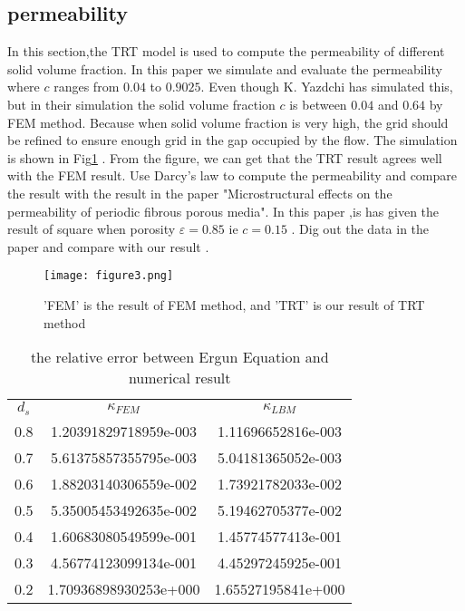 \documentclass{article}
\begin{document}
\subsection{\label{sec:level1}permeability}
In this section,the TRT model is used to compute the permeability of different solid volume fraction. In this paper we simulate and evaluate the permeability where $c$ ranges from $0.04$ to $0.9025$. Even though K. Yazdchi has simulated this, but in their simulation the solid volume fraction $c$ is between $0.04$ and $0.64$ by FEM method. Because when solid volume fraction is very high,  the grid should be refined to ensure enough grid in the gap occupied by the flow.
The simulation is shown in Fig\ref{Fig.lable3} . From the figure, we can get that the TRT result agrees well with the FEM result.
Use Darcy's law to compute the permeability and compare the result with the result in the paper "Microstructural effects on the permeability of periodic fibrous porous media". In this paper ,is has given the result of square when porosity $\varepsilon = 0.85$ ie $c = 0.15$  . Dig out the data in the paper and compare with our result .
\begin{figure}[!ht]
  \centering
  \texttt{[image: figure3.png]}\\
  \caption{'FEM' is the result of FEM method, and 'TRT' is our result of TRT method}\label{Fig.lable3}
\end{figure}
\begin{table}[!h]
\centering
\caption{the relative error between Ergun Equation and numerical result}

\begin{tabular}{ccc}
\hline
 $d_s$& $\kappa_{FEM}$         & $\kappa_{LBM}$ \\
 0.8  & 1.20391829718959e-003  & 1.11696652816e-003\\
 0.7  & 5.61375857355795e-003  & 5.04181365052e-003\\
 0.6  & 1.88203140306559e-002  & 1.73921782033e-002\\
 0.5  & 5.35005453492635e-002  & 5.19462705377e-002\\
 0.4  & 1.60683080549599e-001  & 1.45774577413e-001\\
 0.3  & 4.56774123099134e-001  & 4.45297245925e-001\\
 0.2  & 1.70936898930253e+000  & 1.65527195841e+000 \\
\hline
\end{tabular}

\end{table}
\end{document}
